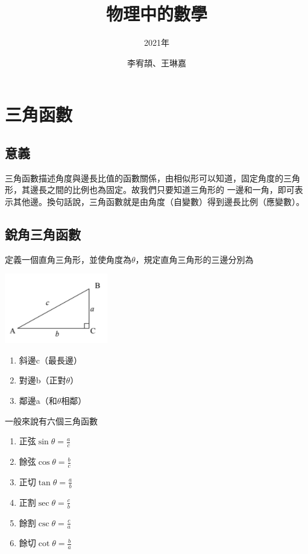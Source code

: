 \documentclass[cn,10pt,math=newtx,chinesefont=founder]{elegantbook}
\title{物理中的數學}
\subtitle{2021年}
\author{李宥頡、王琳嘉}
\institute{拓普科學組}
\begin{document}
\maketitle
\frontmatter

\tableofcontents

\mainmatter

\chapter{三角函數}
\section{意義}
    三角函數描述角度與邊長比值的函數關係，由相似形可以知道，固定角度的三角形，其邊長之間的比例也為固定。故我們只要知道三角形的
    一邊和一角，即可表示其他邊。換句話說，三角函數就是由角度（自變數）得到邊長比例（應變數）。
\section{銳角三角函數}
定義一個直角三角形，並使角度為$\theta$，規定直角三角形的三邊分別為


\begin{minipage}{\linewidth}
      \begin{minipage}{0.45\linewidth}
\raggedleft
\includegraphics[scale=1]{image/直角三角形.png}
      \end{minipage}
      \hspace{0.05\linewidth}
      \begin{minipage}{0.45\linewidth}
\raggedright
\begin{enumerate}
    \item 斜邊c（最長邊）
    \item 對邊b（正對$\theta$）
    \item 鄰邊a（和$\theta$相鄰）
\end{enumerate}
      \end{minipage}
\end{minipage}

一般來說有六個三角函數
\begin{enumerate}
    \itemsep= 10pt
    \item 正弦$\sin \theta = \frac{a}{c}$
    \item 餘弦$\cos \theta = \frac{b}{c}$    
    \item 正切$\tan \theta = \frac{a}{b}$    
    \item 正割$\sec \theta = \frac{c}{b}$
    \item 餘割$\csc \theta = \frac{c}{a}$
    \item 餘切$\cot \theta = \frac{b}{a}$
\end{enumerate}
\end{document}
